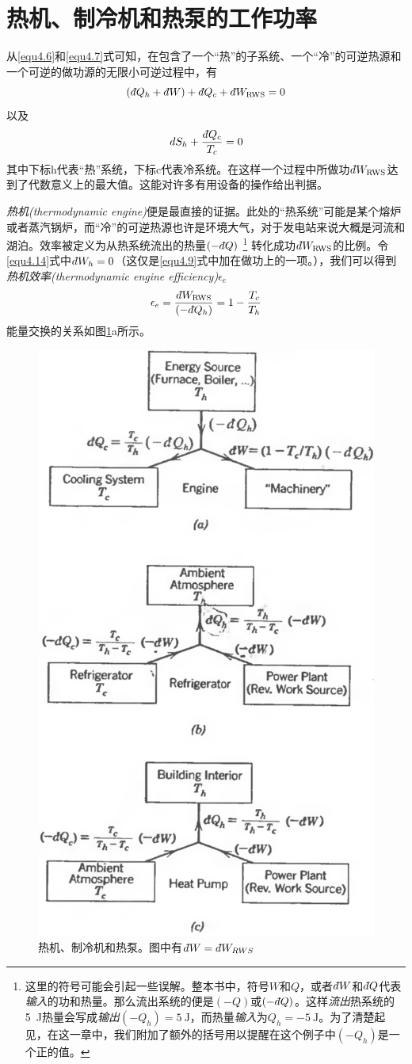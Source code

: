 \section{热机、制冷机和热泵的工作功率}\label{sec4.6}
从\eqref{equ4.6}和\eqref{equ4.7}式可知，在包含了一个“热”的子系统、一个“冷”的可逆热源和一个可逆的做功源的无限小可逆过程中，有
\begin{equation}
(d\hspace*{-0.08em}\bar{}\hspace*{0.1em} Q_h+d\hspace*{-0.08em}\bar{}\hspace*{0.1em} W)+d\hspace*{-0.08em}\bar{}\hspace*{0.1em} Q_c+d\hspace*{-0.08em}\bar{}\hspace*{0.1em} W_\text{RWS} = 0
\label{equ4.14}
\end{equation}
以及
\begin{equation}
dS_h +\frac{d\hspace*{-0.08em}\bar{}\hspace*{0.1em} Q_c}{T_c} = 0
\label{equ4.15}
\end{equation}
其中下标h代表“热”系统，下标c代表冷系统。在这样一个过程中所做功$d\hspace*{-0.08em}\bar{}\hspace*{0.1em} W_\text{RWS}$达到了代数意义上的最大值。这能对许多有用设备的操作给出判据。

{\it 热机(thermodynamic engine)}便是最直接的证据。此处的“热系统”可能是某个熔炉或者蒸汽锅炉，而“冷”的可逆热源也许是环境大气，对于发电站来说大概是河流和湖泊。效率被定义为从热系统流出的热量$(-d\hspace*{-0.08em}\bar{}\hspace*{0.1em} Q)$%
\footnote{这里的符号可能会引起一些误解。整本书中，符号$W$和$Q$，或者$d\hspace*{-0.08em}\bar{}\hspace*{0.1em} W$和$d\hspace*{-0.08em}\bar{}\hspace*{0.1em} Q$代表{\it 输入}的功和热量。那么流出系统的便是$(-Q)$或$(-d\hspace*{-0.08em}\bar{}\hspace*{0.1em} Q)$。这样{\it 流出}热系统的\SI{5}{\joule}热量会写成{\it 输出}$(-Q_h)=\SI{5}{\joule}$，而热量{\it 输入}为$Q_h=\SI{-5}{\joule}$。为了清楚起见，在这一章中，我们附加了额外的括号用以提醒在这个例子中$(-Q_h)$是一个正的值。}%
转化成功$d\hspace*{-0.08em}\bar{}\hspace*{0.1em} W_\text{RWS}$的比例。令\eqref{equ4.14}式中$d\hspace*{-0.08em}\bar{}\hspace*{0.1em} W_h=0$（这仅是\eqref{equ4.9}式中加在做功上的一项。），我们可以得到{\it 热机效率(thermodynamic engine efficiency)}$\epsilon_e$
\begin{equation}
\epsilon_e = \frac{d\hspace*{-0.08em}\bar{}\hspace*{0.1em} W_\text{RWS}}{(-d\hspace*{-0.08em}\bar{}\hspace*{0.1em} Q_h)} = 1 - \frac{T_c}{T_h} 
\end{equation}
能量交换的关系如图\ref{fig4.6}a所示。

\begin{figure}
\centering
\includegraphics[width=.5\textwidth]{Pictures/fig4.6.png}
\caption{热机、制冷机和热泵。图中有$d\hspace*{-0.08em}\bar{}\hspace*{0.1em} W=d\hspace*{-0.08em}\bar{}\hspace*{0.1em} W_{RWS}$}
\label{fig4.6}
\end{figure}

